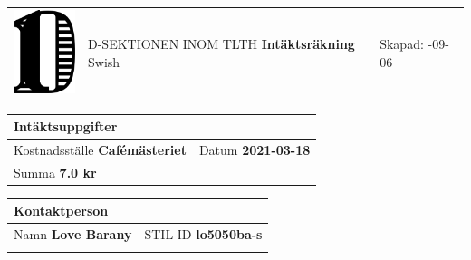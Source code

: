 \documentclass{article}
\newcommand{\skapad}{2021-09-06}
\newcommand{\kostnadsstalle}{Cafémästeriet}
\newcommand{\typ}{Swish}
\newcommand{\datum}{2021-03-18}
\newcommand{\summa}{7.0 kr}
\newcommand{\namn}{Love Barany}
\newcommand{\stilid}{lo5050ba-s}
\begin{document}
    \hspace{-0.3in}
    \begin{tabular}{p{1.0in}p{3.5in}p{2in}}
    \includegraphics[width=0.8in]{D-symbol.pdf} &
    \vspace{-1in}
    {\large \uppercase{D-sektionen inom TLTH}} \newline \newline
    {\Huge \textsf{\textbf{Intäktsräkning}}}
    \newline \newline
    {\large \typ}&
    \vspace{-1in}
    Skapad: \newline
    \skapad \newline
    \end{tabular}

    \vspace{0.5in}
    \hspace{-0.3in}
    \begin{tabular}{|p{1.4in}|p{0.9in}|}
        \multicolumn{2}{l}{Intäktsuppgifter} \\
        \hline
        {\footnotesize Kostnadsställe} \newline \textbf{\kostnadsstalle}&
        {\footnotesize Datum} \newline \textbf{\datum} \\
        \hline
        \multicolumn{2}{|p{2.3in}|}{{\footnotesize Summa} \newline \textbf{\summa}} \\
        \hline
    \end{tabular}
    \hspace{0.1in}
    \begin{tabular}{|p{1.3in}|p{0.9in}|p{1.1in}|}
        \multicolumn{3}{l}{Kontaktperson} \\
        \hline
        \multicolumn{2}{|p{2.2in}|}{{\footnotesize Namn} \newline \textbf{\namn}}
          &
         {\footnotesize STIL-ID} \newline \textbf{\stilid} \\
         \hline
         \multicolumn{3}{p{3.3in}}{{\footnotesize \quad} \newline \textbf{\quad}}
    \end{tabular}
\end{document}
